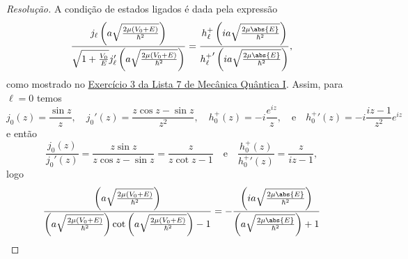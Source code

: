 \begin{proof}[Resolução]
    A condição de estados ligados é dada pela expressão
    \begin{equation*}
        \frac{j_{\ell}\left(a\sqrt{\frac{2\mu (V_0 + E)}{\hbar^2}}\right)}{\sqrt{1 + \frac{V_0}{E}} j'_{\ell}\left(a\sqrt{\frac{2\mu (V_0 + E)}{\hbar^2}}\right)} = \frac{h^+_{\ell}\left(ia\sqrt{\frac{2\mu \abs{E}}{\hbar^2}}\right)}{{h^+_\ell}'\left(ia\sqrt{\frac{2\mu \abs{E}}{\hbar^2}}\right)},
    \end{equation*}
    como mostrado no \href{https://github.com/louisradial/4305001-mecanica-quantica/releases/tag/lista7}{Exercício 3 da Lista 7 de Mecânica Quântica I}. Assim, para \(\ell = 0\) temos
    \begin{equation*}
        j_0(z) = \frac{\sin z}{z},\quad
        j_0'(z) = \frac{z\cos z - \sin z}{z^2},\quad
        h^+_0(z) = -i \frac{e^{iz}}{z},\quad\text{e}\quad
        {h^+_0}'(z) = -i\frac{i z - 1}{z^2} e^{iz}
    \end{equation*}
    e então
    \begin{equation*}
        \frac{j_0(z)}{j_0'(z)} = \frac{z \sin z}{z \cos z - \sin z} = \frac{z}{z \cot z - 1}
        \quad\text{e}\quad
        \frac{h^+_0(z)}{{h^+_0}'(z)} = \frac{z}{iz - 1},
    \end{equation*}
    logo
    \begin{equation*}
        \frac{\left(a\sqrt{\frac{2\mu (V_0 + E)}{\hbar^2}}\right)}{\left(a\sqrt{\frac{2\mu (V_0 + E)}{\hbar^2}}\right) \cot\left(a\sqrt{\frac{2\mu (V_0 + E)}{\hbar^2}}\right) - 1} = -\frac{\left(ia\sqrt{\frac{2\mu \abs{E}}{\hbar^2}}\right)}{\left(a\sqrt{\frac{2\mu \abs{E}}{\hbar^2}}\right) + 1}
    \end{equation*}
\end{proof}
